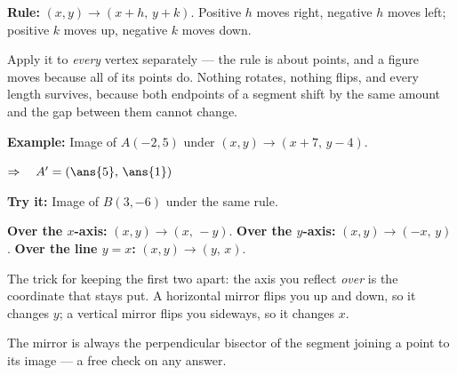 \documentclass[12pt]{article}
\begin{document}


\begin{formulabox}
\textbf{Rule:} $(x, y) \rightarrow (x + h,\, y + k)$. Positive $h$ moves right, negative
$h$ moves left; positive $k$ moves up, negative $k$ moves down.\par
\smallskip
Apply it to \emph{every} vertex separately --- the rule is about points, and a figure moves
because all of its points do. Nothing rotates, nothing flips, and every length survives,
because both endpoints of a segment shift by the same amount and the gap between them
cannot change.
\end{formulabox}

\begin{examplebox}
\textbf{Example:} \quad Image of $A(-2, 5)$ under $(x, y) \rightarrow (x + 7,\, y - 4)$.

$\Rightarrow\quad A' = (\ans{5},\, \ans{1})$
\end{examplebox}

\begin{tryitbox}
\textbf{Try it:} \quad Image of $B(3, -6)$ under the same rule.\\[2pt]
\end{tryitbox}


\begin{formulabox}
\textbf{Over the $x$-axis:} $(x, y) \rightarrow (x,\, -y)$. \quad
\textbf{Over the $y$-axis:} $(x, y) \rightarrow (-x,\, y)$. \quad
\textbf{Over the line $y = x$:} $(x, y) \rightarrow (y,\, x)$.\par
\smallskip
The trick for keeping the first two apart: the axis you reflect \emph{over} is the
coordinate that stays put. A horizontal mirror flips you up and down, so it changes $y$; a
vertical mirror flips you sideways, so it changes $x$.\par
\smallskip
The mirror is always the perpendicular bisector of the segment joining a point to its
image --- a free check on any answer.
\end{formulabox}
\end{document}
